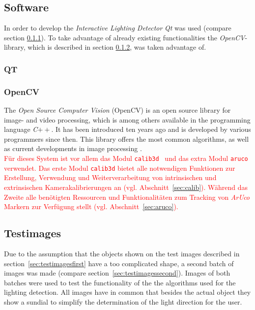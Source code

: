 \subsection{Software} \label{sec:Software}
In order to develop the \textit{Interactive Lighting Detector} \textit{Qt} was used (compare section \ref{sec:qt}). To take advantage of already existing functionalities the \textit{OpenCV}-library, which is described in section \ref{sec:opencv}, was taken advantage of.
\subsubsection{QT} \label{sec:qt}

\subsubsection{OpenCV} \label{sec:opencv}
The \textit{Open Source Computer Vision} (OpenCV) is an open source library for image- and video processing, which is among others available in the programming language \textit{C}$++$. It has been introduced ten years ago and is developed by various programmers since then. This library offers the most common algorithms, as well as current developments in image processing \cite{article:OpenCV}.\\
\textcolor{red}{Für dieses System ist vor allem das Modul \texttt{calib3d}~\cite{website:Calib3dDoc} und das extra Modul \texttt{aruco}~\cite{website:ArucoDoc} verwendet. Das erste Modul \texttt{calib3d}  bietet alle notwendigen Funktionen zur Erstellung, Verwendung und Weiterverarbeitung von intrinsischen und extrinsischen Kamerakalibrierungen an (vgl. Abschnitt~\ref{sec:calib}). Während das Zweite alle benötigten Ressourcen und Funktionalitäten zum Tracking von \textit{ArUco} Markern zur Verfügung stellt (vgl. Abschnitt~\ref{sec:aruco}).}






\subsection{Testimages} \label{sec:testimages}
Due to the assumption that the objects shown on the test images described in section~\ref{sec:testimagesfirst} have a too complicated shape, a second batch of images was made (compare section~\ref{sec:testimagessecond}). Images of both batches were used to test the functionality of the the algorithms used for the lighting detection. All images have in common that besides the actual object they show a sundial to simplify the determination of the light direction for the user.


